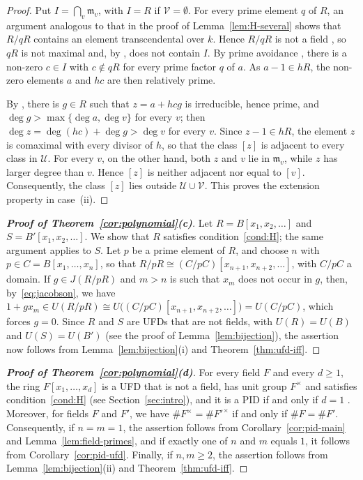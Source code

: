 \documentclass[12pt,reqno,a4paper]{amsart}
\newcommand{\m}{\mathfrak{m}}
\theoremstyle{plain}
\theoremstyle{definition}
\begin{document}
\begin{proof}
Put $I=\bigcap\limits_v\m_v$, with $I=R$ if $\mathcal{V}=\emptyset$. For every prime element $q$ of $R$, an argument analogous to that in the proof of Lemma~\ref{lem:H-several} shows that $R/qR$ contains an element transcendental over $k$. Hence $R/qR$ is not a field \cite[Proposition~7.9]{AtiyahMacdonald}, so $qR$ is not maximal and, by \cite[Proposition~1.11(ii)]{AtiyahMacdonald}, does not contain $I$. By prime avoidance \cite[Proposition~1.11(i)]{AtiyahMacdonald}, there is a non-zero $c\in I$ with $c\notin qR$ for every prime factor $q$ of $a$. As $a-1\in hR$, the non-zero elements $a$ and $hc$ are then relatively prime.

By \cite[Theorem~1.3]{BodinDebesNajib}, there is $g\in R$ such that $z=a+hcg$ is irreducible, hence prime, and $\deg g>\max\{\deg a,\deg v\}$ for every $v$; then $\deg z=\deg(hc)+\deg g>\deg v$ for every $v$. Since $z-1\in hR$, the element $z$ is comaximal with every divisor of $h$, so that the class $[z]$ is adjacent to every class in $\mathcal{U}$. For every $v$, on the other hand, both $z$ and $v$ lie in $\m_v$, while $z$ has larger degree than $v$. Hence $[z]$ is neither adjacent nor equal to $[v]$. Consequently, the class $[z]$ lies outside $\mathcal{U}\cup\mathcal{V}$. This proves the extension property in case~(ii).
\end{proof}
\begin{proof}[\normalfont\bfseries Proof of Theorem~\ref{cor:polynomial}(c)]
Let $R=B[x_1,x_2,\dots]$ and $S=B'[x_1,x_2,\dots]$. We show that $R$ satisfies condition~\ref{cond:H}; the same argument applies to $S$. Let $p$ be a prime element of $R$, and choose $n$ with $p\in C=B[x_1,\dots,x_n]$, so that $R/pR\cong(C/pC)[x_{n+1},x_{n+2},\dots]$, with $C/pC$ a domain. If $g\in J(R/pR)$ and $m>n$ is such that $x_m$ does not occur in $g$, then, by~\eqref{eq:jacobson}, we have $1+gx_m\in U(R/pR)\cong U\bigl((C/pC)[x_{n+1},x_{n+2},\dots]\bigr)=U(C/pC)$, which forces $g=0$. Since $R$ and $S$ are UFDs that are not fields, with $U(R)=U(B)$ and $U(S)=U(B')$ (see the proof of Lemma~\ref{lem:bijection}), the assertion now follows from Lemma~\ref{lem:bijection}(i) and Theorem~\ref{thm:ufd-iff}.
\end{proof}
\begin{proof}[\normalfont\bfseries Proof of Theorem~\ref{cor:polynomial}(d)]
For every field $F$ and every $d\geq1$, the ring $F[x_1,\dots,x_d]$ is a UFD that is not a field, has unit group $F^\times$ and satisfies condition~\ref{cond:H} (see Section~\ref{sec:intro}), and it is a PID if and only if $d=1$ \cite[Section~8.2, Corollary~8, and Section~9.2, Corollary~4]{DummitFoote}. Moreover, for fields $F$ and $F'$, we have $\#F^\times=\#F'^\times$ if and only if $\#F=\#F'$. Consequently, if $n=m=1$, the assertion follows from Corollary~\ref{cor:pid-main} and Lemma~\ref{lem:field-primes}, and if exactly one of $n$ and $m$ equals $1$, it follows from Corollary~\ref{cor:pid-ufd}. Finally, if $n,m\geq2$, the assertion follows from Lemma~\ref{lem:bijection}(ii) and Theorem~\ref{thm:ufd-iff}. 
\end{proof}
\end{document}
